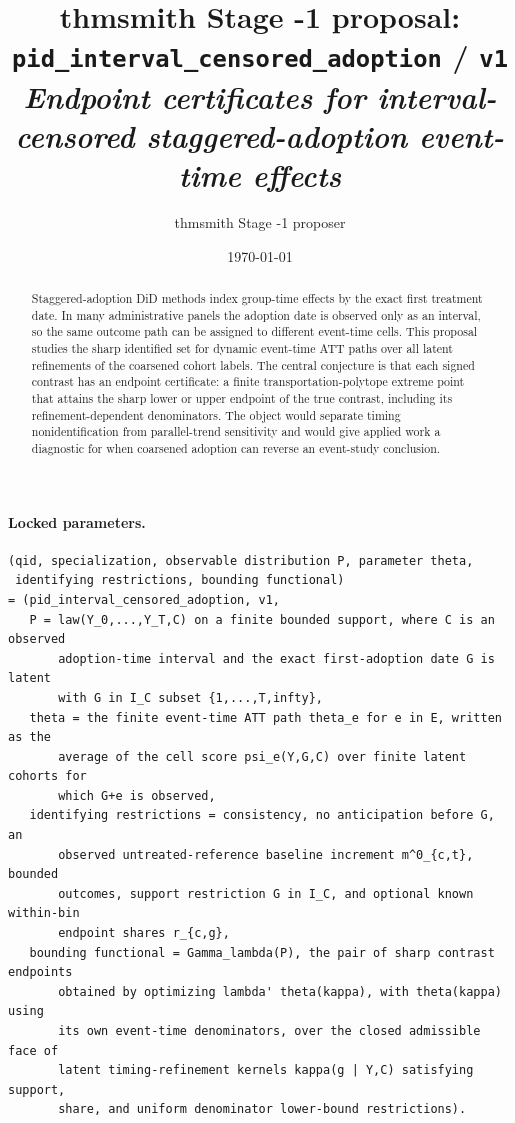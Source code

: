 \documentclass[11pt]{article}
\title{thmsmith Stage -1 proposal: \texttt{pid\_interval\_censored\_adoption} / \texttt{v1}%
  \\ \large\textit{Endpoint certificates for interval-censored staggered-adoption event-time effects}}
\author{thmsmith Stage -1 proposer}
\date{\today}
\theoremstyle{definition}
\theoremstyle{plain}
\theoremstyle{remark}
\begin{document}
\maketitle


\paragraph{Locked parameters.}
\begin{verbatim}
(qid, specialization, observable distribution P, parameter theta,
 identifying restrictions, bounding functional)
= (pid_interval_censored_adoption, v1,
   P = law(Y_0,...,Y_T,C) on a finite bounded support, where C is an observed
       adoption-time interval and the exact first-adoption date G is latent
       with G in I_C subset {1,...,T,infty},
   theta = the finite event-time ATT path theta_e for e in E, written as the
       average of the cell score psi_e(Y,G,C) over finite latent cohorts for
       which G+e is observed,
   identifying restrictions = consistency, no anticipation before G, an
       observed untreated-reference baseline increment m^0_{c,t}, bounded
       outcomes, support restriction G in I_C, and optional known within-bin
       endpoint shares r_{c,g},
   bounding functional = Gamma_lambda(P), the pair of sharp contrast endpoints
       obtained by optimizing lambda' theta(kappa), with theta(kappa) using
       its own event-time denominators, over the closed admissible face of
       latent timing-refinement kernels kappa(g | Y,C) satisfying support,
       share, and uniform denominator lower-bound restrictions).
\end{verbatim}

\begin{abstract}
Staggered-adoption DiD methods index group-time effects by the exact first treatment date. In many administrative panels the adoption date is observed only as an interval, so the same outcome path can be assigned to different event-time cells. This proposal studies the sharp identified set for dynamic event-time ATT paths over all latent refinements of the coarsened cohort labels. The central conjecture is that each signed contrast has an endpoint certificate: a finite transportation-polytope extreme point that attains the sharp lower or upper endpoint of the true contrast, including its refinement-dependent denominators. The object would separate timing nonidentification from parallel-trend sensitivity and would give applied work a diagnostic for when coarsened adoption can reverse an event-study conclusion.
\end{abstract}
\end{document}
